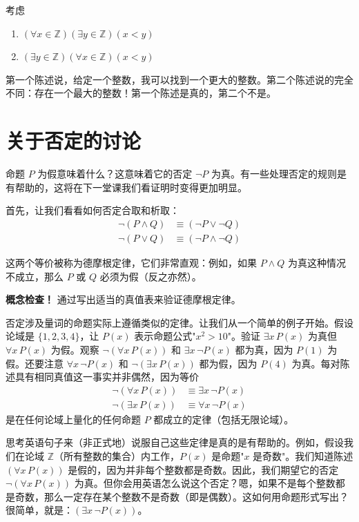 \documentclass[11pt]{article}
\begin{document}
考虑
\begin{enumerate}
\item $(\forall x \in \mathbb{Z})(\exists y \in \mathbb{Z})(x < y)$
\item $(\exists y \in \mathbb{Z})(\forall x \in \mathbb{Z})(x < y)$
\end{enumerate}

第一个陈述说，给定一个整数，我可以找到一个更大的整数。第二个陈述说的完全不同：存在一个最大的整数！第一个陈述是真的，第二个不是。

\section{关于否定的讨论}

命题 $P$ 为假意味着什么？这意味着它的否定 $\neg P$ 为真。有一些处理否定的规则是有帮助的，这将在下一堂课我们看证明时变得更加明显。

首先，让我们看看如何否定合取和析取：
\begin{align*}
\neg(P \land Q) &\equiv (\neg P \lor \neg Q) \\
\neg(P \lor Q) &\equiv (\neg P \land \neg Q)
\end{align*}

这两个等价被称为德摩根定律，它们非常直观：例如，如果 $P \land Q$ 为真这种情况不成立，那么 $P$ 或 $Q$ 必须为假（反之亦然）。

\textbf{概念检查！} 通过写出适当的真值表来验证德摩根定律。

否定涉及量词的命题实际上遵循类似的定律。让我们从一个简单的例子开始。假设论域是 $\{1, 2, 3, 4\}$，让 $P(x)$ 表示命题公式"$x^2 > 10$"。验证 $\exists x\,P(x)$ 为真但 $\forall x\,P(x)$ 为假。观察 $\neg(\forall x\,P(x))$ 和 $\exists x\,\neg P(x)$ 都为真，因为 $P(1)$ 为假。还要注意 $\forall x\,\neg P(x)$ 和 $\neg(\exists x\,P(x))$ 都为假，因为 $P(4)$ 为真。每对陈述具有相同真值这一事实并非偶然，因为等价
\begin{align*}
\neg(\forall x\,P(x)) &\equiv \exists x\,\neg P(x) \\
\neg(\exists x\,P(x)) &\equiv \forall x\,\neg P(x)
\end{align*}
是在任何论域上量化的任何命题 $P$ 都成立的定律（包括无限论域）。

思考英语句子来（非正式地）说服自己这些定律是真的是有帮助的。例如，假设我们在论域 $\mathbb{Z}$（所有整数的集合）内工作，$P(x)$ 是命题"$x$ 是奇数"。我们知道陈述 $(\forall x\,P(x))$ 是假的，因为并非每个整数都是奇数。因此，我们期望它的否定 $\neg(\forall x\,P(x))$ 为真。但你会用英语怎么说这个否定？嗯，如果不是每个整数都是奇数，那么一定存在某个整数不是奇数（即是偶数）。这如何用命题形式写出？很简单，就是：$(\exists x\,\neg P(x))$。
\end{document}
